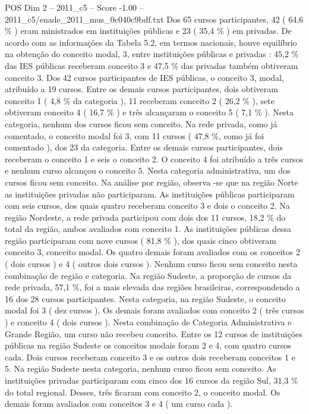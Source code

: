 \begin{textsample}{POS Dim 2 – 2011\_c5 – Score -1.00 – 2011\_c5/enade\_2011\_mus\_0c040c9bdf.txt}
Dos 65 cursos participantes, 42 ( 64,6 \% ) eram ministrados em instituições públicas e 23 ( 35,4 \% ) em privadas.
De acordo com as informações da Tabela 5.2, em termos nacionais, houve equilíbrio na obtenção do conceito modal, 3, entre instituições públicas e privadas : 45,2 \% das IES públicas receberam conceito 3 e 47,5 \% das privadas também obtiveram conceito 3.
Dos 42 cursos participantes de IES públicas, o conceito 3, modal, atribuído a 19 cursos.
Entre os demais cursos participantes, dois obtiveram conceito 1 ( 4,8 \% da categoria ), 11 receberam conceito 2 ( 26,2 \% ), sete obtiveram conceito 4 ( 16,7 \% ) e três alcançaram o conceito 5 ( 7,1 \% ).
Nesta categoria, nenhum dos cursos ficou sem conceito.
Na rede privada, como já comentado, o conceito modal foi 3, com 11 cursos ( 47,8 \%, como já foi comentado ), dos 23 da categoria.
Entre os demais cursos participantes, dois receberam o conceito 1 e seis o conceito 2.
O conceito 4 foi atribuído a três cursos e nenhum curso alcançou o conceito 5.
Nesta categoria administrativa, um dos cursos ficou sem conceito.
Na análise por região, observa -se que na região Norte as instituições privadas não participaram.
As instituições públicas participaram com seis cursos, dos quais quatro receberam conceito 3 e dois o conceito 2.
Na região Nordeste, a rede privada participou com dois dos 11 cursos, 18,2 \% do total da região, ambos avaliados com conceito 1.
As instituições públicas dessa região participaram com nove cursos ( 81,8 \% ), dos quais cinco obtiveram conceito 3, conceito modal.
Os quatro demais foram avaliados com os conceitos 2 ( dois cursos ) e 4 ( outros dois cursos ).
Nenhum curso ficou sem conceito nesta combinação de região e categoria.
Na região Sudeste, a proporção de cursos da rede privada, 57,1 \%, foi a mais elevada das regiões brasileiras, correspondendo a 16 dos 28 cursos participantes.
Nesta categoria, na região Sudeste, o conceito modal foi 3 ( dez cursos ).
Os demais foram avaliados com conceito 2 ( três cursos ) e conceito 4 ( dois cursos ).
Nesta combinação de Categoria Administrativa e Grande Região, um curso não recebeu conceito.
Entre os 12 cursos de instituições públicas na região Sudeste os conceitos modais foram 2 e 4, com quatro cursos cada.
Dois cursos receberam conceito 3 e os outros dois receberam conceitos 1 e 5.
Na região Sudeste nesta categoria, nenhum curso ficou sem conceito.
As instituições privadas participaram com cinco dos 16 cursos da região Sul, 31,3 \% do total regional.
Desses, três ficaram com conceito 2, o conceito modal.
Os demais foram avaliados com conceitos 3 e 4 ( um curso cada ).

\end{textsample}
